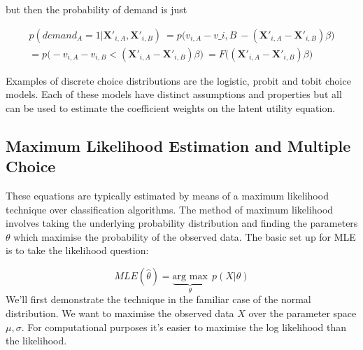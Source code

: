 \documentclass[]{tufte-book}
\theoremstyle{definition}
\theoremstyle{definition}
\theoremstyle{definition}
\theoremstyle{remark}
\begin{document}
but then the probability of demand is just

\begin{equation} \begin{split} p(demand_A = 1 | \mathbf{X'}_{i, A}, \mathbf{X'}_{i, B}) \ = p\Bigg( v_{i,A} - v\_{i,B} \> - (\mathbf{X'}_{i, A} - \mathbf{X'}_{i, B})\beta \Bigg) \\ = p\Bigg( -v_{i,A} - v_{i,B} < (\mathbf{X'}_{i, A} - \mathbf{X'}_{i, B})\beta \Bigg) \ = F\Bigg( (\mathbf{X'}_{i, A} - \mathbf{X'}_{i, B})\beta \Bigg) \end{split} \end{equation}

Examples of discrete choice distributions are the logistic, probit and tobit choice models. Each of these models have distinct assumptions and properties but all can be used to estimate the coefficient weights on the latent utility equation.

\hypertarget{maximum-likelihood-estimation-and-multiple-choice}{%
\subsection{Maximum Likelihood Estimation and Multiple Choice}\label{maximum-likelihood-estimation-and-multiple-choice}}

These equations are typically estimated by means of a maximum likelihood technique over classification algorithms. The method of maximum likelihood involves taking the underlying probability distribution and finding the parameters \(\theta\) which maximise the probability of the observed data. The basic set up for MLE is to take the likelihood question:

\[ MLE(\hat{\theta}) = \underbrace{\text{arg max}}_{\theta} \ \ p(X | \theta) \] We'll first demonstrate the technique in the familiar case of the normal distribution. We want to maximise the observed data \(X\) over the parameter space \(\mu, \sigma\). For computational purposes it's easier to maximise the log likelihood than the likelihood.
\end{document}
